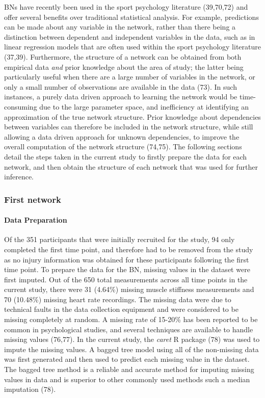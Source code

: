 \documentclass[
  english,
  man]{apa6}
\let\oldparagraph\paragraph
\renewcommand{\paragraph}[1]{\oldparagraph{#1}\mbox{}}
\begin{document}
BNs have recently been used in the sport psychology literature (39,70,72) and offer several benefits over traditional statistical analysis.
For example, predictions can be made about any variable in the network, rather than there being a distinction between dependent and independent variables in the data, such as in linear regression models that are often used within the sport psychology literature (37,39).
Furthermore, the structure of a network can be obtained from both empirical data \emph{and} prior knowledge about the area of study; the latter being particularly useful when there are a large number of variables in the network, or only a small number of observations are available in the data (73).
In such instances, a purely data driven approach to learning the network would be time-consuming due to the large parameter space, and inefficiency at identifying an approximation of the true network structure.
Prior knowledge about dependencies between variables can therefore be included in the network structure, while still allowing a data driven approach for unknown dependencies, to improve the overall computation of the network structure (74,75).
The following sections detail the steps taken in the current study to firstly prepare the data for each network, and then obtain the structure of each network that was used for further inference.

\hypertarget{first-network}{%
\subsubsection{First network}\label{first-network}}

\hypertarget{data-preparation}{%
\paragraph{Data Preparation}\label{data-preparation}}

Of the 351 participants that were initially recruited for the study, 94 only completed the first time point, and therefore had to be removed from the study as no injury information was obtained for these participants following the first time point.
To prepare the data for the BN, missing values in the dataset were first imputed.
Out of the 650 total measurements across all time points in the current study, there were 31 (4.64\%) missing muscle stiffness measurements and 70 (10.48\%) missing heart rate recordings. The missing data were due to technical faults in the data collection equipment and were considered to be missing completely at random.
A missing rate of 15-20\% has been reported to be common in psychological studies, and several techniques are available to handle missing values (76,77).
In the current study, the \emph{caret} R package (78) was used to impute the missing values.
A bagged tree model using all of the non-missing data was first generated and then used to predict each missing value in the dataset.
The bagged tree method is a reliable and accurate method for imputing missing values in data and is superior to other commonly used methods such a median imputation (78).
\end{document}
